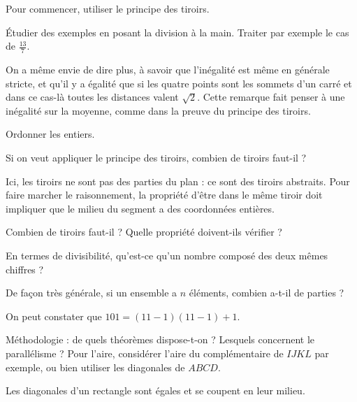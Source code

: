 \begin{Hint}{4}
Pour commencer, utiliser le principe des tiroirs.
\end{Hint}
\begin{Hint}{5}
\'Etudier des exemples en posant la division à la main. Traiter par exemple le cas de $\frac{13}{7}$.
\end{Hint}
\begin{Hint}{7}
On a même envie de dire plus, à savoir que l'inégalité est même en générale stricte, et qu'il y a égalité que si les quatre points sont les sommets d'un carré et dans ce cas-là toutes les distances valent $\sqrt2$. Cette remarque fait penser à une inégalité sur la moyenne, comme dans la preuve du principe des tiroirs.
\end{Hint}
\begin{Hint}{8}
Ordonner les entiers.
\end{Hint}
\begin{Hint}{9}
Si on veut appliquer le principe des tiroirs, combien de tiroirs faut-il ?
\end{Hint}
\begin{Hint}{10}
Ici, les tiroirs ne sont pas des parties du plan : ce sont des tiroirs \og abstraits\fg. Pour faire marcher le raisonnement, la propriété d'être dans le même tiroir doit impliquer que le milieu du segment a des coordonnées entières.
\end{Hint}
\begin{Hint}{11}
Combien de tiroirs faut-il ? Quelle propriété doivent-ils vérifier ?
\end{Hint}
\begin{Hint}{14}
En termes de divisibilité, qu'est-ce qu'un nombre composé des deux mêmes chiffres ?
\end{Hint}
\begin{Hint}{15}
De façon très générale, si un ensemble a $n$ éléments, combien a-t-il de parties ?
\end{Hint}
\begin{Hint}{19}
On peut constater que $101=\left(11-1\right)\left(11-1\right)+1$.
\end{Hint}
\begin{Hint}{21}
 Méthodologie : de quels théorèmes dispose-t-on ? Lesquels concernent le parallélisme ? Pour l'aire, considérer l'aire du complémentaire de $IJKL$ par exemple, ou bien utiliser les diagonales de $ABCD$.
\end{Hint}
\begin{Hint}{22}
Les diagonales d'un rectangle sont égales et se coupent en leur milieu. %
\end{Hint}
